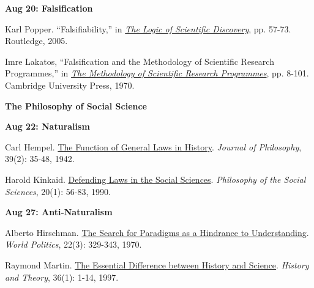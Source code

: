 \documentclass[letterpaper]{article}
\renewenvironment{itemize}{
  \begin{list}{}{
    \setlength{\leftmargin}{1.5em}
  }
}{
  \end{list}
}
\begin{document}
\begin{enumerate}
		\begin{itemize}
		\item {\bf Aug 20: Falsification}
			\begin{itemize}
				\item[$\bullet$] Karl Popper. ``Falsifiability,'' in \href{https://archive.org/details/PopperLogicScientificDiscovery}{\emph{The Logic of Scientific Discovery}}, pp. 57-73. Routledge, 2005.
				\item[$\bullet$] Imre Lakatos, ``Falsification and the Methodology of Scientific Research Programmes,'' in \href{http://strangebeautiful.com/other-texts/lakatos-meth-sci-research-phil-papers-1.pdf}{\emph{The Methodology of Scientific Research Programmes}}, pp. 8-101. Cambridge University Press, 1970. 
			\end{itemize}
		\end{itemize}




\item {\bf The Philosophy of Social Science}
		
		\begin{itemize}
		\item {\bf Aug 22: Naturalism}
			\begin{itemize}
					\item[$\bullet$] Carl Hempel. \href{https://www.jstor.org/stable/pdf/2017635.pdf}{The Function of General Laws in History}. \emph{Journal of Philosophy}, 39(2): 35-48, 1942.
					\item[$\bullet$] Harold Kinkaid. \href{http://journals.sagepub.com/doi/pdf/10.1177/004839319002000104}{Defending Laws in the Social Sciences}. \emph{Philosophy of the Social Sciences}, 20(1): 56-83, 1990.
			\end{itemize}
		\end{itemize}


		\begin{itemize}
		\item {\bf Aug 27: Anti-Naturalism}
			\begin{itemize}
					\item[$\bullet$] Alberto Hirschman. \href{http://www.jstor.org/stable/2009600}{The Search for Paradigms as a Hindrance to Understanding}. \emph{World Politics}, 22(3): 329-343, 1970. 
					\item[$\bullet$] Raymond Martin. \href{http://www.jstor.org/stable/2505422}{The Essential Difference between History and Science}. \emph{History and Theory}, 36(1): 1-14, 1997. 
			\end{itemize}
		\end{itemize}



\end{enumerate}
\end{document}

